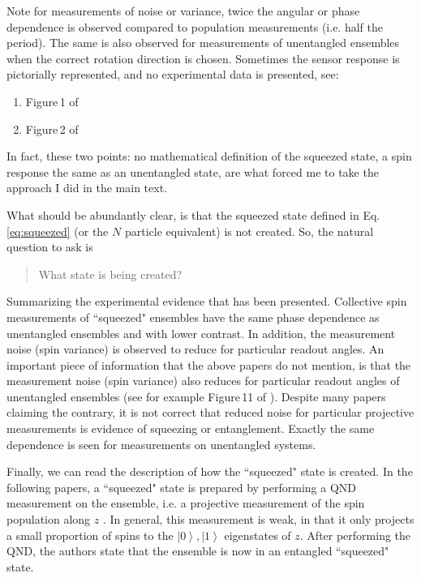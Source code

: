 \documentclass[reqno]{amsart}
\newcommand{\ket}[1]{\left| #1 \right>}
\begin{document}
Note for measurements of noise or variance, twice the angular or phase dependence is observed compared to population measurements (i.e. half the period). The same is also observed for measurements of unentangled ensembles when the correct rotation direction is chosen. Sometimes the sensor response is pictorially represented, and no experimental data is presented, see: 
\begin{enumerate}
\item Figure\,1 of \cite{Appel2009}
\item Figure\,2 of \cite{Leroux2010a}
\end{enumerate}
In fact, these two points: no mathematical definition of the squeezed state, a spin response the same as an unentangled state, are what forced me to take the approach I did in the main text.

What should be abundantly clear, is that the squeezed state defined in Eq.\,\eqref{eq:squeezed} (or the $N$ particle equivalent) is not created. So, the natural question to ask is
\begin{quotation}
What state is being created?
\end{quotation}
Summarizing the experimental evidence that has been presented. Collective spin measurements of ``squeezed" ensembles have the same phase dependence as unentangled ensembles and with lower contrast. In addition, the measurement noise (spin variance) is observed to reduce for particular readout angles. An important piece of information that the above papers do not mention, is that the measurement noise (spin variance) also reduces for particular readout angles of unentangled ensembles (see for example Figure\,11 of \cite{Itano1993}). Despite many papers claiming the contrary, it is not correct that reduced noise for particular projective measurements is evidence of squeezing or entanglement. Exactly the same dependence is seen for measurements on unentangled systems.

Finally, we can read the description of how the ``squeezed" state is created. In the following papers, a ``squeezed" state is prepared by performing a QND measurement on the ensemble, i.e. a projective measurement of the spin population along $z$ \cite{Appel2009, Leroux2010, Leroux2010a, LouchetChauvet2010, SchleierSmith2010, Bohnet2014, Cox2016, Hosten2016, Braverman2019, Malia2020, Bao2020, PedrozoPenafiel2020, Greve2022, Malia2022, Hosten2016a, Colombo2022}. In general, this measurement is weak, in that it only projects a small proportion of spins to the $\ket{0}, \ket{1}$ eigenstates of $z$. After performing the QND, the authors state that the ensemble is now in an entangled ``squeezed" state.
\end{document}
